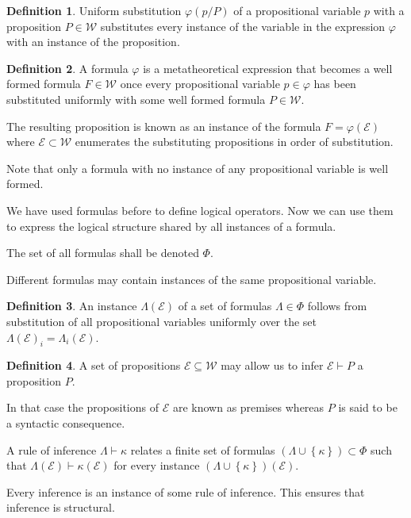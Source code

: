 \documentclass{amsbook}
\newcommand{\setsm}[1]{\left\{#1\right\}}
\newcommand{\wffs}{\mathcal W}
\newcommand{\infers}{\mathrel\vdash}
\theoremstyle{definition}
\newtheorem{dfn}{Definition}[section]
\begin{document}
\begin{dfn}
    Uniform substitution $\varphi(p / P)$ of a propositional variable $p$ with a proposition $P \in \wffs$ substitutes every instance of the variable in the expression $\varphi$ with an instance of the proposition.
\end{dfn}

\begin{dfn}
    A formula $\varphi$ is a metatheoretical expression that becomes a well formed formula $F \in \wffs$ once every propositional variable $p \in \varphi$ has been substituted uniformly with some well formed formula $P \in \wffs$.

    The resulting proposition is known as an instance of the formula $F = \varphi(\mathcal E)$ where $\mathcal E \subset \wffs$ enumerates the substituting propositions in order of substitution.
\end{dfn}

Note that only a formula with no instance of any propositional variable is well formed.

We have used formulas before to define logical operators.
Now we can use them to express the logical structure shared by all instances of a formula.

The set of all formulas shall be denoted $\Phi$.

Different formulas may contain instances of the same propositional variable.

\begin{dfn}
    An instance $\varLambda(\mathcal E)$ of a set of formulas $\varLambda \in \Phi$ follows from substitution of all propositional variables uniformly over the set $\varLambda(\mathcal E)_i = \varLambda_i(\mathcal E)$.
\end{dfn}

\begin{dfn}
    A set of propositions $\mathcal E \subseteq \wffs$ may allow us to infer $\mathcal E \infers P$ a proposition $P$.

    In that case the propositions of $\mathcal E$ are known as premises whereas $P$ is said to be a syntactic consequence.

    A rule of inference $\Lambda \infers \kappa$ relates a finite set of formulas $(\varLambda \cup \setsm \kappa) \subset \Phi$ such that $\varLambda(\mathcal E) \infers \kappa(\mathcal E)$ for every instance $(\varLambda \cup \setsm \kappa)(\mathcal E)$.

    Every inference is an instance of some rule of inference. This ensures that inference is structural.
\end{dfn}
\end{document}
